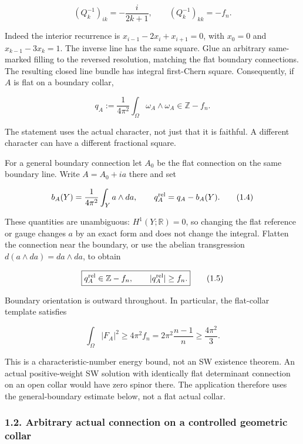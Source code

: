 \documentclass[
  11pt,
]{article}
\begin{document}
\[
 (Q_k^{-1})_{ik}=-\frac{i}{2k+1},\qquad
 (Q_k^{-1})_{kk}=-f_n.
 \tag{1.2}
\]

Indeed the interior recurrence is \(x_{i-1}-2x_i+x_{i+1}=0\), with
\(x_0=0\) and \(x_{k-1}-3x_k=1\). The inverse line has the same square.
Glue an arbitrary same-marked filling to the reversed resolution,
matching the flat boundary connections. The resulting closed line bundle
has integral first-Chern square. Consequently, if \(A\) is flat on a
boundary collar,

\[
 q_A:=\frac1{4\pi^2}\int_\Omega\omega_A\wedge\omega_A
                  \in\mathbb Z-f_n.
 \tag{1.3}
\]

The statement uses the actual character, not just that it is faithful. A
different character can have a different fractional square.

For a general boundary connection let \(A_0\) be the flat connection on
the same boundary line. Write \(A=A_0+ia\) there and set

\[
 b_A(Y)=\frac1{4\pi^2}\int_Y a\wedge da,
 \qquad q_A^{\rm rel}=q_A-b_A(Y).
 \tag{1.4}
\]

These quantities are unambiguous: \(H^1(Y;\mathbb R)=0\), so changing
the flat reference or gauge changes \(a\) by an exact form and does not
change the integral. Flatten the connection near the boundary, or use
the abelian transgression \(d(a\wedge da)=da\wedge da\), to obtain

\[
 \boxed{q_A^{\rm rel}\in\mathbb Z-f_n,\qquad
 |q_A^{\rm rel}|\ge f_n.}
 \tag{1.5}
\]

Boundary orientation is outward throughout. In particular, the
flat-collar template satisfies

\[
 \boxed{\int_\Omega|F_A|^2\ge4\pi^2 f_n
             =2\pi^2\frac{n-1}{n}\ge\frac{4\pi^2}{3}.}
 \tag{1.6}
\]

This is a characteristic-number energy bound, not an SW existence
theorem. An actual positive-weight SW solution with identically flat
determinant connection on an open collar would have zero spinor there.
The application therefore uses the general-boundary estimate below, not
a flat actual collar.

\hypertarget{arbitrary-actual-connection-on-a-controlled-geometric-collar}{%
\subsubsection{1.2. Arbitrary actual connection on a controlled
geometric
collar}\label{arbitrary-actual-connection-on-a-controlled-geometric-collar}}
\end{document}
